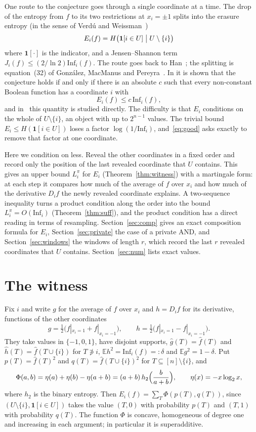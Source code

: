 \documentclass[11pt]{amsart}
\theoremstyle{remark}
\newcommand{\Inf}{\mathrm{Inf}}
\newcommand{\E}{\mathbb{E}}
\begin{document}
One route to the conjecture goes through a single coordinate at a time. The drop of the entropy from $f$ to its two
restrictions at $x_i=\pm1$ splits into the erasure entropy (in the sense of Verd\'u and Weissman~\cite{VW08})
\[
E_i(f)=H\bigl(\mathbf 1[i\in U]\bigm| U\setminus\{i\}\bigr)
\]
where $\mathbf 1[\cdot]$ is the indicator, and a Jensen--Shannon term $J_i(f)\le(2/\ln 2)\Inf_i(f)$. The route goes back to Han~\cite[Remark~3.2]{Han}; the
splitting is equation~(32) of Gonz\'alez, MacManus and Pereyra~\cite{GMP}. In
\cite{Shm1} it is shown that the conjecture holds if and only if there is an absolute $c$ such that every non-constant
Boolean function has a coordinate $i$ with
\begin{equation}\label{eq:good}
E_i(f)\le c\,\Inf_i(f),
\end{equation}
and in~\cite{Shm3} this quantity is studied directly. The difficulty is that $E_i$ conditions on the whole of
$U\setminus\{i\}$, an object with up to $2^{n-1}$ values. The trivial bound $E_i\le H(\mathbf 1[i\in U])$ loses a factor
$\log(1/\Inf_i)$, and~\eqref{eq:good} asks exactly to remove that factor at one coordinate.

Here we condition on less. Reveal the other coordinates in a fixed order and record only the position of the last
revealed coordinate that $U$ contains. This gives an upper bound $L^\pi_i$ for $E_i$ (Theorem~\ref{thm:witness}) with a
martingale form: at each step it compares how much of the average of $f$ over $x_i$ and how much of the derivative $D_if$ the
newly revealed coordinate explains. A two-sequence inequality turns a product condition along the order into the bound
$L^\pi_i=O(\Inf_i)$ (Theorem~\ref{thm:suff}), and the product condition has a direct reading in terms of resampling.
Section~\ref{sec:comp} gives an exact composition formula for $E_i$, Section~\ref{sec:private} the case of a private
AND, and Section~\ref{sec:windows} the windows of length $r$, which record the last $r$ revealed coordinates that $U$ contains. Section~\ref{sec:num} lists
exact values.

\section{The witness}\label{sec:witness}

Fix $i$ and write $g$ for the average of $f$ over $x_i$ and $h=D_if$ for its derivative, functions of the other coordinates
\[
g=\tfrac12\bigl(f|_{x_i=1}+f|_{x_i=-1}\bigr),\qquad h=\tfrac12\bigl(f|_{x_i=1}-f|_{x_i=-1}\bigr).
\]
They take values in $\{-1,0,1\}$, have disjoint supports, $\hat g(T)=\hat f(T)$ and $\hat h(T)=\hat f(T\cup\{i\})$ for
$T\not\ni i$, $\E h^2=\Inf_i(f)=:\delta$ and $\E g^2=1-\delta$. Put $p(T)=\hat f(T)^2$ and $q(T)=\hat f(T\cup\{i\})^2$ for
$T\subseteq[n]\setminus\{i\}$, and
\[
\Phi(a,b)=\eta(a)+\eta(b)-\eta(a+b)=(a+b)\,h_2\Bigl(\frac{b}{a+b}\Bigr),\qquad \eta(x)=-x\log_2x,
\]
where $h_2$ is the binary entropy. Then $E_i(f)=\sum_T\Phi(p(T),q(T))$, since $(U\setminus\{i\},\mathbf 1[i\in U])$ takes
the value $(T,0)$ with probability $p(T)$ and $(T,1)$ with probability $q(T)$. The function $\Phi$ is concave,
homogeneous of degree one and increasing in each argument; in particular it is superadditive.
\end{document}
